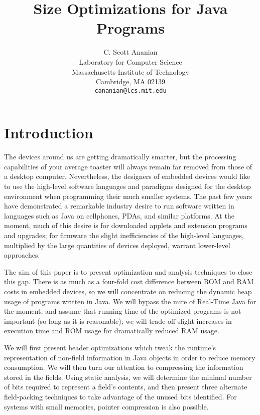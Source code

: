 \documentclass[preprint]{acmconf}
\title{\bf Size Optimizations for Java Programs}
\author{C. Scott Ananian \\
	Laboratory for Computer Science\\
	Massachusetts Institute of Technology\\ 
	Cambridge, MA 02139 \\ 
	{\tt cananian@lcs.mit.edu} }
\begin{document}
\pagestyle{myheadings}


\maketitle



\section{Introduction}
The devices around us are getting dramatically smarter, but the
processing capabilities of your average toaster will always remain far
removed from those of a desktop computer.  Nevertheless, the designers
of embedded devices would like to use the high-level software
languages and paradigms designed for the desktop environment when
programming their much smaller systems.  The past few years have
demonstrated a remarkable industry desire to run software written in
languages such as Java on cellphones, PDAs, and similar platforms.
At the moment, much of this desire is for downloaded applets and
extension programs and upgrades; for firmware the slight
inefficiencies of the high-level languages, multiplied by the large
quantities of devices deployed, warrant lower-level approaches.

The aim of this paper is to present optimization and analysis
techniques to close this gap.  There is as much as a four-fold
cost difference between ROM and RAM costs in embedded devices,
so we will concentrate on reducing the dynamic heap usage of
programs written in Java.  We will bypass the mire of Real-Time Java
for the moment, and assume that running-time of the optimized programs
is not important (so long as it is reasonable); we will trade-off
slight increases in execution time and ROM usage for dramatically
reduced RAM usage.

We will first present header optimizations which tweak the runtime's
representation of non-field information in Java objects in order to
reduce memory consumption.  We will then turn our attention to
compressing the information stored in the fields.  Using static
analysis, we will determine the minimal number of bits required to
represent a field's contents, and then present three alternate
field-packing techniques to take advantage of the unused bits
identified.  For systems with small memories, pointer compression is
also possible.
\end{document}
